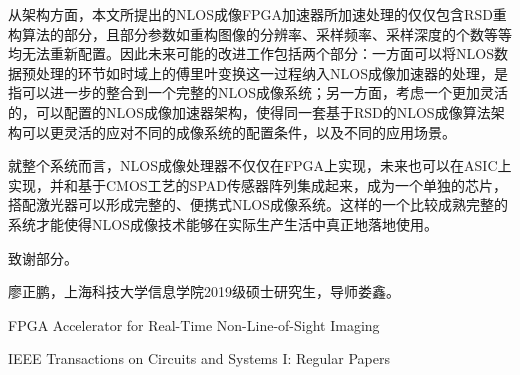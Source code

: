 \documentclass[master]{shtthesis}             %
\makeatletter
\def\ifgraduate{\ifsht@graduate}
\makeatother
\begin{document}
从架构方面，本文所提出的NLOS成像FPGA加速器所加速处理的仅仅包含RSD重构算法的部分，且部分参数如重构图像的分辨率、采样频率、采样深度的个数等等均无法重新配置。因此未来可能的改进工作包括两个部分：一方面可以将NLOS数据预处理的环节如时域上的傅里叶变换这一过程纳入NLOS成像加速器的处理，是指可以进一步的整合到一个完整的NLOS成像系统；另一方面，考虑一个更加灵活的，可以配置的NLOS成像加速器架构，使得同一套基于RSD的NLOS成像算法架构可以更灵活的应对不同的成像系统的配置条件，以及不同的应用场景。

就整个系统而言，NLOS成像处理器不仅仅在FPGA上实现，未来也可以在ASIC上实现，并和基于CMOS工艺的SPAD传感器阵列集成起来，成为一个单独的芯片，搭配激光器可以形成完整的、便携式NLOS成像系统。这样的一个比较成熟完整的系统才能使得NLOS成像技术能够在实际生产生活中真正地落地使用。

\makebiblio


\backmatter
\begin{acknowledgement}
致谢部分。
\end{acknowledgement}

\ifgraduate
\begin{resume}
  廖正鹏，上海科技大学信息学院2019级硕士研究生，导师娄鑫。
\end{resume}

\begin{publications}
  FPGA Accelerator for Real-Time Non-Line-of-Sight Imaging
\end{publications}

\begin{publications*}
  IEEE Transactions on Circuits and Systems I: Regular Papers
\end{publications*}



\fi
\end{document}
